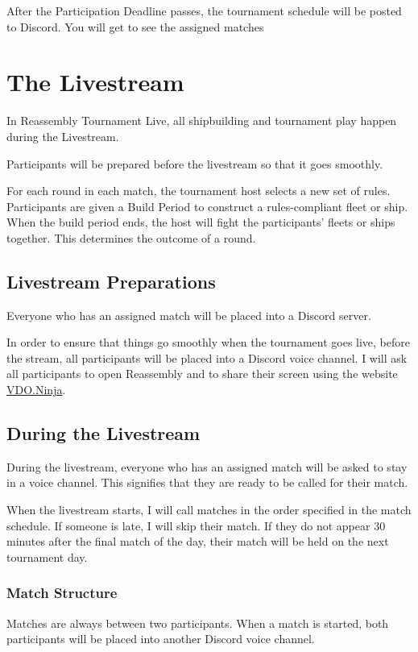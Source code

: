 \documentclass[11pt]{article}
\newcommand{\RTL}{Reassembly Tournament Live}
\begin{document}
After the Participation Deadline passes, the tournament schedule will be posted to Discord.
You will get to see the assigned matches 

\section{The Livestream}
In \RTL{}, all shipbuilding and tournament play happen during the Livestream.

Participants will be prepared before the livestream so that it goes smoothly.

For each round in each match, the tournament host selects a new set of rules. Participants are
given a Build Period to construct a rules-compliant fleet or ship. When the build period ends,
the host will fight the participants' fleets or ships together. This determines the outcome of
a round.

\subsection{Livestream Preparations}
Everyone who has an assigned match will be placed into a Discord server. 

In order to ensure that things go smoothly when the tournament goes live, before the stream, 
all participants will be placed into a Discord voice channel. I will ask all participants to open 
Reassembly and to share their screen using the website \href{https://vdo.ninja/}{VDO.Ninja}.

\subsection{During the Livestream}
During the livestream, everyone who has an assigned match will be asked to stay in a voice
channel. This signifies that they are ready to be called for their match. 

When the livestream starts, I will call matches in the order specified in the match schedule.
If someone is late, I will skip their match. If they do not appear
30 minutes after the final match of the day, their match will be held on the next tournament day.

\subsubsection{Match Structure}
Matches are always between two participants.
When a match is started, both participants will be placed into another Discord voice channel.
\end{document}

